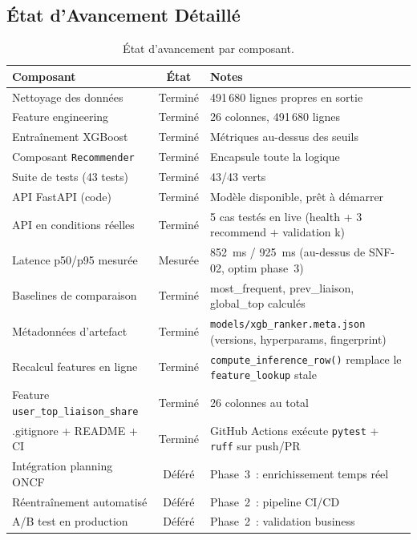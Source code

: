 \documentclass[11pt, a4paper]{article}
\begin{document}
\subsection{État d'Avancement Détaillé}

\begin{table}[h]
\centering
\small
\begin{tabularx}{\textwidth}{|l|c|X|}
\hline
\textbf{Composant} & \textbf{État} & \textbf{Notes} \\
\hline
Nettoyage des données          & Terminé & 491\,680 lignes propres en sortie \\
\hline
Feature engineering            & Terminé & 26 colonnes, 491\,680 lignes \\
\hline
Entraînement XGBoost           & Terminé & Métriques au-dessus des seuils \\
\hline
Composant \texttt{Recommender} & Terminé & Encapsule toute la logique \\
\hline
Suite de tests (43 tests)      & Terminé & 43/43 verts \\
\hline
API FastAPI (code)             & Terminé & Modèle disponible, prêt à démarrer \\
\hline
API en conditions réelles      & Terminé & 5 cas testés en live (health + 3 recommend + validation k) \\
\hline
Latence p50/p95 mesurée        & Mesurée & 852~ms / 925~ms (au-dessus de SNF-02, optim phase~3) \\
\hline
Baselines de comparaison       & Terminé & most\_frequent, prev\_liaison, global\_top calculés \\
\hline
Métadonnées d'artefact         & Terminé & \texttt{models/xgb\_ranker.meta.json} (versions, hyperparams, fingerprint) \\
\hline
Recalcul features en ligne     & Terminé & \texttt{compute\_inference\_row()} remplace le \texttt{feature\_lookup} stale \\
\hline
Feature \texttt{user\_top\_liaison\_share} & Terminé & 26 colonnes au total \\
\hline
.gitignore + README + CI       & Terminé & GitHub Actions exécute \texttt{pytest} + \texttt{ruff} sur push/PR \\
\hline
Intégration planning ONCF      & Déféré & Phase~3~: enrichissement temps réel \\
\hline
Réentraînement automatisé      & Déféré & Phase~2~: pipeline CI/CD \\
\hline
A/B test en production         & Déféré & Phase~2~: validation business \\
\hline
\end{tabularx}
\caption{État d'avancement par composant.}
\end{table}
\end{document}
